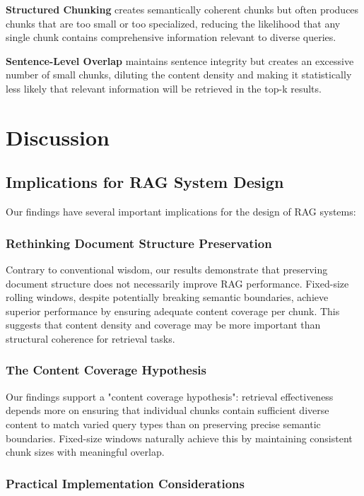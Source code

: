 \documentclass[11pt,a4paper]{article}
\begin{document}
\textbf{Structured Chunking} creates semantically coherent chunks but often produces chunks that are too small or too specialized, reducing the likelihood that any single chunk contains comprehensive information relevant to diverse queries.

\textbf{Sentence-Level Overlap} maintains sentence integrity but creates an excessive number of small chunks, diluting the content density and making it statistically less likely that relevant information will be retrieved in the top-k results.

\section{Discussion}

\subsection{Implications for RAG System Design}

Our findings have several important implications for the design of RAG systems:

\subsubsection{Rethinking Document Structure Preservation}

Contrary to conventional wisdom, our results demonstrate that preserving document structure does not necessarily improve RAG performance. Fixed-size rolling windows, despite potentially breaking semantic boundaries, achieve superior performance by ensuring adequate content coverage per chunk. This suggests that content density and coverage may be more important than structural coherence for retrieval tasks.

\subsubsection{The Content Coverage Hypothesis}

Our findings support a "content coverage hypothesis": retrieval effectiveness depends more on ensuring that individual chunks contain sufficient diverse content to match varied query types than on preserving precise semantic boundaries. Fixed-size windows naturally achieve this by maintaining consistent chunk sizes with meaningful overlap.

\subsubsection{Practical Implementation Considerations}
\end{document}
